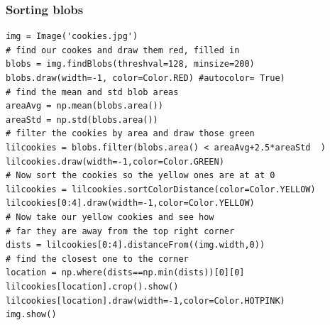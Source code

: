 \documentclass{beamer}
\begin{document}
\begin{frame}[fragile] 
\frametitle{Sorting blobs}
\begin{example}
\begin{verbatim}
img = Image('cookies.jpg')
# find our cookes and draw them red, filled in
blobs = img.findBlobs(threshval=128, minsize=200)
blobs.draw(width=-1, color=Color.RED) #autocolor= True)
# find the mean and std blob areas
areaAvg = np.mean(blobs.area())
areaStd = np.std(blobs.area())
# filter the cookies by area and draw those green
lilcookies = blobs.filter(blobs.area() < areaAvg+2.5*areaStd  )
lilcookies.draw(width=-1,color=Color.GREEN)
# Now sort the cookies so the yellow ones are at at 0
lilcookies = lilcookies.sortColorDistance(color=Color.YELLOW)
lilcookies[0:4].draw(width=-1,color=Color.YELLOW)
# Now take our yellow cookies and see how
# far they are away from the top right corner
dists = lilcookies[0:4].distanceFrom((img.width,0))
# find the closest one to the corner
location = np.where(dists==np.min(dists))[0][0]
lilcookies[location].crop().show()
lilcookies[location].draw(width=-1,color=Color.HOTPINK)
img.show()
\end{verbatim}
\end{example}
\end{frame} 
\end{document}
